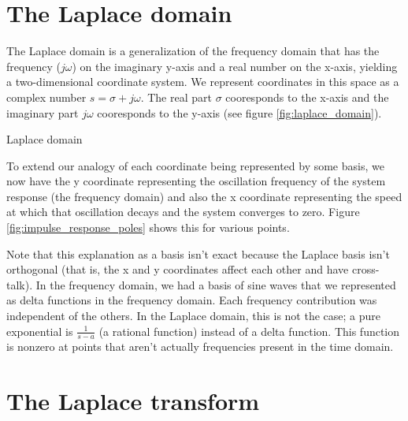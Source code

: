 \section{The Laplace domain}

The Laplace domain is a generalization of the frequency domain that has the
frequency ($j\omega$) on the imaginary y-axis and a real number on the x-axis,
yielding a two-dimensional coordinate system. We represent coordinates in this
space as a complex number $s = \sigma + j\omega$. The real part $\sigma$
cooresponds to the x-axis and the imaginary part $j\omega$ cooresponds to the
y-axis (see figure \ref{fig:laplace_domain}).

\begin{bookfigure}

  \caption{Laplace domain}
  \label{fig:laplace_domain}
\end{bookfigure}

To extend our analogy of each coordinate being represented by some basis, we now
have the y coordinate representing the oscillation frequency of the system
response (the frequency domain) and also the x coordinate representing the speed
at which that oscillation decays and the system converges to zero. Figure
\ref{fig:impulse_response_poles} shows this for various points.

Note that this explanation as a basis isn't exact because the Laplace basis
isn't orthogonal (that is, the x and y coordinates affect each other and have
cross-talk). In the frequency domain, we had a basis of sine waves that we
represented as delta functions in the frequency domain. Each frequency
contribution was independent of the others. In the Laplace domain, this is not
the case; a pure exponential is $\frac{1}{s -a}$ (a rational function) instead
of a delta function. This function is nonzero at points that aren't actually
frequencies present in the time domain.

\section{The Laplace transform}

